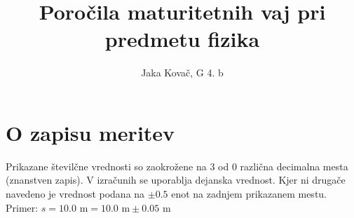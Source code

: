 \documentclass[12pt]{article}
\title{Poročila maturitetnih vaj pri predmetu fizika}
\author{Jaka Kovač, G 4. b}
\begin{document}












\section*{O zapisu meritev}
Prikazane številčne vrednosti so zaokrožene na 3 od 0 različna decimalna mesta (znanstven zapis).
V izračunih se uporablja dejanska vrednost. Kjer ni drugače navedeno je vrednost podana na
$\pm 0.5$ enot na zadnjem prikazanem mestu. Primer: $s = 10.0 \text{ m} = 10.0 \text{ m} \pm 0.05 \text{ m}$
\end{document}
